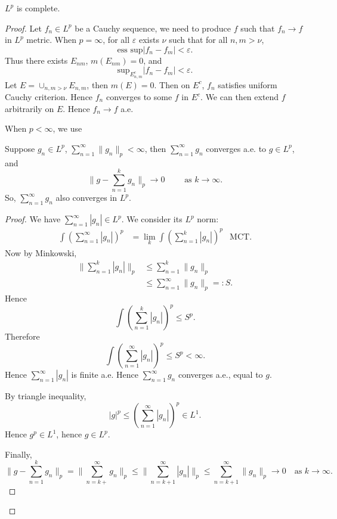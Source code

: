 \begin{theorem}
	$L^p$ is complete. 
\end{theorem}
\begin{proof}
	Let $f_n \in L^p$ be a Cauchy sequence, we need to produce $f$ such that $f_n \to f$ in $L^p$ metric. When $p = \infty $, for all $\varepsilon$ exists $\nu$ such that for all $n, m > \nu$,
	\[
		\text{ess sup} |f_n - f_m| < \varepsilon
	.\] 
	Thus there exists $E_{nm}$, $m(E_{nm}) = 0$, and
	\[
		\text{sup}_{E_{n, m}^c} |f_n - f_m| < \varepsilon
	.\] 
	Let $E = \cup_{n, m > \nu} E_{n, m}$, then $m(E) = 0$. Then on $E^c$, $f_n$ satisfies uniform Cauchy criterion. Hence $f_n$ converges to some $f$ in $E^c$. We can then extend $f$ arbitrarily on $E$. Hence $f_n \to f$ a.e.

	When $p < \infty $, we use
	\begin{lemma}
		Suppose $g_n \in L^p$, $\sum_{n=1}^{\infty} \|g_n\|_p < \infty $, then $\sum_{n=1}^\infty  g_n$ converges a.e. to $g \in L^p$, and 
		\[
			\|g - \sum_{n=1}^{k} g_n\|_p \to  0 \qquad \text{ as }k\to \infty 
		.\] 
		So, $\sum_{n=1}^{\infty} g_n$ also converges in $L^p$.
	\end{lemma}
	\begin{proof}
		We have $\sum_{n=1}^{\infty} \left| g_n \right|  \in L^p$. We consider its $L^p$ norm:
		\begin{align*}
			\int  \left( \sum_{n=1}^{\infty} |g_n| \right) ^p
			&= \lim_k \int \left(\sum_{n=1}^{k} |g_n| \right)^p & \text{MCT}
		.\end{align*}
		Now by Minkowski,
		\begin{align*}
			\|\sum_{n=1}^{k} |g_n|\|_p 
			&\le \sum_{n=1}^{k} \|g_n\|_p \\
			&\le \sum_{n=1}^{\infty} \|g_n\|_p =:S
		.\end{align*}
		Hence
		\[
			\int \left(\sum_{n=1}^{k} |g_n| \right)^p \le S^p
		.\] 
		Therefore
		\[
			\int  \left( \sum_{n=1}^{\infty} |g_n| \right) ^p \le S^p < \infty 
		.\] 
		Hence $ \sum_{n=1}^{\infty} |g_n| $ is finite a.e. Hence  $\sum_{n=1}^{\infty} g_n$ converges a.e., equal to $g$.

		By triangle inequality,
		\[
			|g|^p \le \left( \sum_{n=1}^{\infty} |g_n| \right) ^p \in L^1
		.\] 
		Hence $g^p \in L^1$, hence $g \in L^p$.

		Finally,
		\[
			\|g - \sum_{n=1}^{k} g_n\|_p 
			= \|\sum_{n=k+}^{\infty} g_n\|_p
			\le  \|\sum_{n=k+1}^{\infty} |g_n|\|_p
			\le \sum_{n=k+1}^{\infty} \|g_n\|_p \to 0 \quad \text{as } k \to \infty 
		.\] 
		

\end{proof}
\end{proof}
